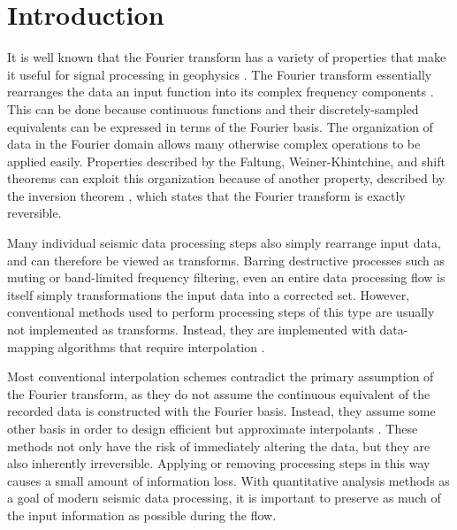 \maketitle

\section{Introduction}
It is well known that the Fourier transform has a variety of properties that make it useful for signal processing in geophysics \cite{yilmaz01}.
The Fourier transform essentially rearranges the data an input function into its complex frequency components \cite{karl89}.
This can be done because continuous functions and their discretely-sampled equivalents can be expressed in terms of the Fourier basis.
The organization of data in the Fourier domain allows many otherwise complex operations to be applied easily.
Properties described by the Faltung, Weiner-Khintchine, and shift theorems \cite{sneddon95} can exploit this organization because of another property, described by the inversion theorem \cite{sneddon95}, which states that the Fourier transform is exactly reversible.   

Many individual seismic data processing steps also simply rearrange input data, and can therefore be viewed as transforms.
Barring destructive processes such as muting or band-limited frequency filtering, even an entire data processing flow is itself simply transformations the input data into a corrected set.
However, conventional methods used to perform processing steps of this type are usually not implemented as transforms.
Instead, they are implemented with data-mapping algorithms that require interpolation \cite{harlan82}.

Most conventional interpolation schemes contradict the primary assumption of the Fourier transform, as they do not assume the continuous equivalent of the recorded data is constructed with the Fourier basis.
Instead, they assume some other basis in order to design efficient but approximate interpolants \cite[]{karl89}.
These methods not only have the risk of immediately altering the data, but they are also inherently irreversible.
Applying or removing processing steps in this way causes a small amount of information loss.
With quantitative analysis methods as a goal of modern seismic data processing, it is important to preserve as much of the input information as possible during the flow.    

